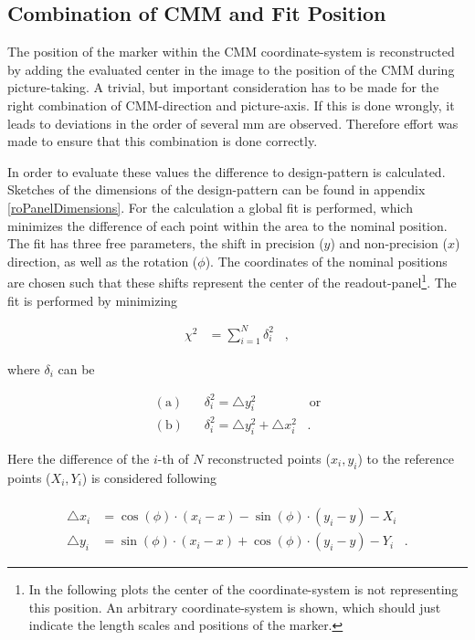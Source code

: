 \documentclass[
twoside,            %
BCOR1.4cm,          %
10pt,               %
headings=normal,    %
headsepline,        %
clearplainpage,		%
final,              %
div=14,
open=right,
bibliography=toc
]{scrreprt}
\begin{document}
\subsection{Combination of CMM and Fit Position}
\label{CMMimageCombination}

The position of the marker within the CMM coordinate-system is reconstructed by adding the evaluated center in the image to the position of the CMM during picture-taking.
A trivial, but important consideration has to be made for the right combination of CMM-direction and picture-axis.
If this is done wrongly, it leads to deviations in the order of several mm are observed.
Therefore effort was made to ensure that this combination is done correctly.

In order to evaluate these values the difference to design-pattern is calculated.
Sketches of the dimensions of the design-pattern can be found in appendix \ref{roPanelDimensions}.
For the calculation a global fit is performed, which minimizes the difference of each point within the area to the nominal position.
The fit has three free parameters, the shift in precision ($y$) and non-precision ($x$) direction, as well as the rotation ($\phi$).
The coordinates of the nominal positions are chosen such that these shifts represent the center of the readout-panel\footnote{
	In the following plots the center of the coordinate-system is not representing this position.
	An arbitrary coordinate-system is shown, which should just indicate the length scales and positions of the marker.
}.
The fit is performed by minimizing

\begin{align}
	\chi^2 &= \sum_{i=1}^{N} \delta_i^2 \;\;\; ,
\end{align}

where $\delta_i$ can be

\begin{align}
	(\mathrm{a})& \;\;\; \delta_i^2 = \bigtriangleup y_i^2  \;\;\;\;\;\;\;\;\;\;\;\;\;\;\; \text{or}
	\\
	(\mathrm{b})& \;\;\; \delta_i^2 = \bigtriangleup y_i^2 + \bigtriangleup x_i^2 \;\;\; .
\end{align}

Here the difference of the $i$-th of $N$ reconstructed points ($x_i,y_i$) to the reference points ($X_i,Y_i$) is considered following 

\begin{align}
	\\
	\bigtriangleup x_i &= \cos(\phi) \cdot ( x_i - x ) - \sin(\phi) \cdot ( y_i - y ) - X_i
	\\
	\bigtriangleup y_i &= \sin(\phi) \cdot ( x_i - x ) + \cos(\phi) \cdot ( y_i - y ) - Y_i \;\;\;.
\end{align}
\end{document}
